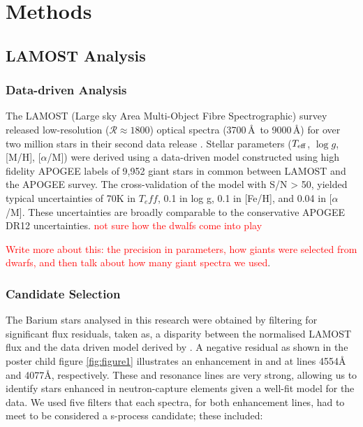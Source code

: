 \documentclass[a4paper,fleqn,usenatbib]{mnras}
\newcommand{\todo}[1]{\textcolor{red}{#1}}
\begin{document}
\section{Methods} \label{sec:methods}
\subsection{LAMOST Analysis}
\subsubsection{Data-driven Analysis}
The LAMOST (Large sky Area Multi-Object Fibre Spectrographic) survey released low-resolution ($\mathcal{R} \approx 1800$) optical spectra (3700\,\AA\ to 9000\,\AA) for over two million stars in their second data release \citep{luo2015}. Stellar parameters ($T_{\rm eff}$, $\log{g}$, [M/H], [$\alpha$/M]) were derived using a data-driven model constructed using high fidelity APOGEE labels of 9,952 giant stars in common between LAMOST and the APOGEE survey. The cross-validation of the model with S/N > 50, yielded typical uncertainties of 70K in $T_eff$, 0.1 in log g, 0.1 in [Fe/H], and 0.04 in [$\alpha$/M]. These uncertainties are broadly comparable to the conservative APOGEE DR12 uncertainties. \todo{not sure how the dwalfs come into play}

\todo{Write more about this: the precision in parameters, how giants were selected from dwarfs, and then talk about how many giant spectra we used}.

\subsubsection{Candidate Selection} \label{sec:cand}
The Barium stars analysed in this research were obtained by filtering for significant flux residuals, taken as, a disparity between the normalised LAMOST flux and the data driven model derived by \citet{ho2017}. A negative residual as shown in the poster child figure \ref{fig:figure1} illustrates an enhancement in  and  at lines 4554\AA \hspace{0.2mm} and 4077\AA, respectively. These  and  resonance lines are very strong, allowing us to identify stars enhanced in neutron-capture elements given a well-fit model for the data. We used five filters that each spectra, for both enhancement lines, had to meet to be considered a s-process candidate; these included:

\renewcommand\labelenumi{(\roman{enumi})}
\renewcommand\theenumi\labelenumi
\end{document}
